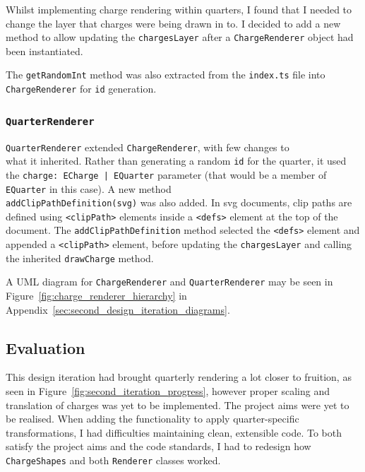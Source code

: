 \documentclass[nobib, a4paper, twoside, justified]{tufte-book}
\makeatletter
\newcommand{\svg}{\gls{svg}\@\xspace}
\newcommand{\charge}{\gls{charge}\@\xspace}
\newcommand{\charges}{\glspl{charge}\@\xspace}
\newcommand{\quarters}{\glspl{quarter}\@\xspace}
\makeatother
\begin{document}
Whilst implementing \charge rendering within \quarters, I found that I needed to change the
layer that \charges were being drawn in to. I decided to add a new method to allow updating
the \texttt{chargesLayer} after a \texttt{ChargeRenderer} object had been instantiated.

The \texttt{getRandomInt} method was also extracted from the \texttt{index.ts} file
into \texttt{ChargeRenderer} for \texttt{id} generation.

\subsubsection{\texttt{QuarterRenderer}}%
\label{ssub:quarter_renderer}

\texttt{QuarterRenderer} extended \texttt{ChargeRenderer}, with few changes to \\ what it
inherited. Rather than generating a random \texttt{id} for the quarter, it used the \texttt{charge:
ECharge | EQuarter} parameter (that would be a member of \texttt{EQuarter} in this case). A new
method \\ \texttt{addClipPathDefinition(svg)} was also added. In \svg documents, clip paths are
defined using \texttt{<clipPath>} elements inside a \texttt{<defs>} element at the top of the
document. The \texttt{addClipPathDefinition} method selected the \texttt{<defs>} element and
appended a \texttt{<clipPath>} element, before updating the \texttt{chargesLayer} and calling the
inherited \texttt{drawCharge} method.

A UML diagram for \texttt{ChargeRenderer} and \texttt{QuarterRenderer} may be seen in
Figure~\ref{fig:charge_renderer_hierarchy} in Appendix~\ref{sec:second_design_iteration_diagrams}.

\subsection{Evaluation}%
\label{sub:second_design_evaluation}

This design iteration had brought quarterly rendering a lot closer to fruition, as seen in
Figure~\ref{fig:second_iteration_progress}, however proper scaling and translation of charges was
yet to be implemented. The project aims were yet to be realised. When adding the
functionality to apply quarter-specific transformations, I had difficulties maintaining clean,
extensible code. To both satisfy the project aims and the code standards, I had to redesign how
\texttt{ChargeShapes} and both \texttt{Renderer} classes worked.
\end{document}

